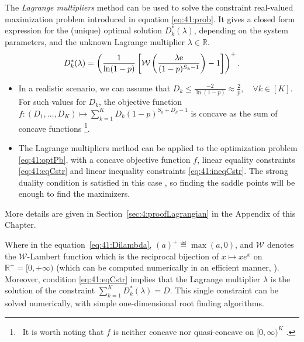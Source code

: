 \begin{proposition}\label{prop:41:Lagrangian}
\begin{leftbar}[propositionbar]  %
    The \emph{Lagrange multipliers} method \cite{BoydVanderberghe04} can be used to solve the constraint real-valued maximization problem introduced in equation \eqref{eq:41:prob}.
    It gives a closed form expression for the (unique) optimal solution $D_k^*(\lambda)$, depending on the system parameters, and the unknown Lagrange multiplier $\lambda \in \mathbb{R}$.
    \begin{equation}\label{eq:41:Dilambda}
        D_k^*(\lambda) = \left(\frac{1}{\ln(1-p)}\left[ \mathcal{W}\left(\frac{\lambda \mathrm{e}}{(1-p)^{S_k-1}} \right)-1 \right]\right)^{+} .
    \end{equation}
\end{leftbar}  %
\end{proposition}
%
\begin{smallproof}
\begin{itemize}
    \item
    In a realistic scenario, we can assume that $D_k\leq \frac{-2}{\ln\left(1-p\right)} \approx \frac{2}{p},\quad \forall k\in[K]$. For such values for $D_k$, the objective function $f: (D_1, \dots, D_{K}) \mapsto \sum_{k=1}^{K} D_k (1 - p)^{S_k + D_k -1}$ is concave as the sum of concave functions
    \footnote{~It is worth noting that $f$ is neither concave nor quasi-concave on $[0,\infty)^{K}$ \cite{Luenberger68,Yaari77}.}.
    \item
    The Lagrange multipliers method can be applied to the optimization problem \eqref{eq:41:optPb}, with a concave objective function $f$, linear equality constraints \eqref{eq:41:eqCstr} and linear inequality constraints \eqref{eq:41:ineqCstr}. The strong duality condition is satisfied in this case \cite{BoydVanderberghe04}, so finding the saddle points will be enough to find the maximizers.
    \end{itemize}
    More details are given in Section~\ref{sec:4:proofLagrangian} in the Appendix of this Chapter.
\end{smallproof}

Where in the equation~\eqref{eq:41:Dilambda}, $(a)^{+} \eqdef \max(a,0)$, and $\mathcal{W}$ denotes the $\mathcal{W}$-Lambert function which is the reciprocal bijection of $x \mapsto x e^x$ on $\mathbb{R^+} = [0, +\infty)$ (which can be computed numerically in an efficient manner, \cite{Corless96}).
Moreover, condition \eqref{eq:41:eqCstr} implies that the Lagrange multiplier $\lambda$ is the solution of the constraint $\sum_{k=1}^{K} D_k^*(\lambda) = D$.
This single constraint can be solved numerically, with simple one-dimensional root finding algorithms.

